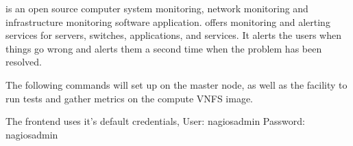 \Nagios{} is an open source computer system monitoring, network monitoring and infrastructure monitoring software application. \Nagios{} offers monitoring and alerting services for servers, switches, applications, and services. It alerts the users when things go wrong and alerts them a second time when the problem has been resolved.

The following commands will set up \Nagios{} on the master node, as well as the facility to run tests and gather metrics on the compute VNFS image.

The \Nagios{} frontend uses it's default credentials, User: nagiosadmin  Password: nagiosadmin
